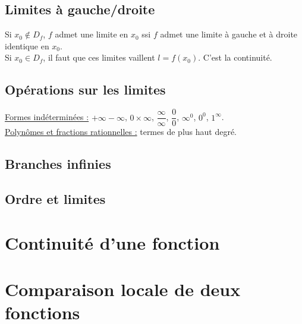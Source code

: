     \subsection{Limites à gauche/droite}\label{subsec:limites-a-gauche/droite}
        
        Si $x_0 \notin D_f$, $f$ admet une limite en $x_0$ ssi $f$ admet une limite à gauche et à droite identique en $x_0$.\\
        Si $x_0 \in D_f$, il faut que ces limites vaillent $l = f(x_0)$.
        C'est la continuité.\\
    
    \subsection{Opérations sur les limites}\label{subsec:operations-sur-les-limites}
        
        \underline{Formes indéterminées :} $+\infty -\infty$, $0 \times \infty$, $\dfrac{\infty}{\infty}$, $\dfrac{0}{0}$, $\infty^0$, $0^0$, $1^{\infty}$.\\
        \underline{Polynômes et fractions rationnelles :} termes de plus haut degré.\\
    
    \subsection{Branches infinies}\label{subsec:branches-infinies}
    
    \subsection{Ordre et limites}\label{subsec:ordre-et-limites}


\section{Continuité d'une fonction}\label{sec:continuite-d'une-fonction}


\section{Comparaison locale de deux fonctions}\label{sec:comparaison-locale-de-deux-fonctions}






